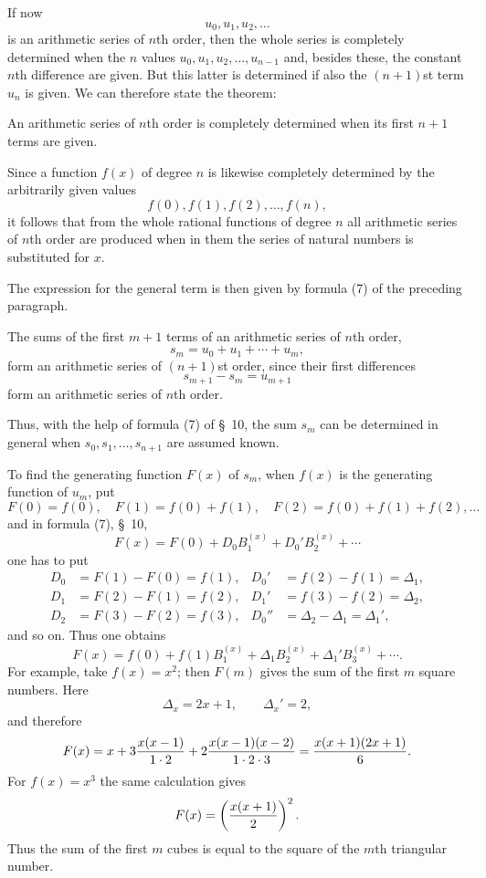 \documentclass[11pt]{article}
\begin{document}
If now
\[
 u_0,u_1,u_2,\ldots
\]
is an arithmetic series of $n$th order, then the whole series is completely determined when the $n$ values $u_0,u_1,u_2,\ldots,u_{n-1}$ and, besides these, the constant $n$th difference are given. But this latter is determined if also the $(n+1)$st term $u_n$ is given. We can therefore state the theorem:

An arithmetic series of $n$th order is completely determined when its first $n+1$ terms are given.

Since a function $f(x)$ of degree $n$ is likewise completely determined by the arbitrarily given values
\[
 f(0),f(1),f(2),\ldots,f(n),
\]
it follows that from the whole rational functions of degree $n$ all arithmetic series of $n$th order are produced when in them the series of natural numbers is substituted for $x$.

The expression for the general term is then given by formula (7) of the preceding paragraph.

The sums of the first $m+1$ terms of an arithmetic series of $n$th order,
\[
 s_m=u_0+u_1+\cdots+u_m,
\]
form an arithmetic series of $(n+1)$st order, since their first differences
\[
 s_{m+1}-s_m=u_{m+1}
\]
form an arithmetic series of $n$th order.

Thus, with the help of formula (7) of \S~10, the sum $s_m$ can be determined in general when $s_0,s_1,\ldots,s_{n+1}$ are assumed known.

To find the generating function $F(x)$ of $s_m$, when $f(x)$ is the generating function of $u_m$, put
\[
 F(0)=f(0),\quad F(1)=f(0)+f(1),\quad F(2)=f(0)+f(1)+f(2),\ldots
\]
and in formula (7), \S~10,
\[
 F(x)=F(0)+D_0B_1^{(x)}+D_0'B_2^{(x)}+\cdots
\]
one has to put
\[
\begin{aligned}
D_0&=F(1)-F(0)=f(1),& D_0'&=f(2)-f(1)=\Delta_1,\\
D_1&=F(2)-F(1)=f(2),& D_1'&=f(3)-f(2)=\Delta_2,\\
D_2&=F(3)-F(2)=f(3),& D_0''&=\Delta_2-\Delta_1=\Delta_1',
\end{aligned}
\]
and so on. Thus one obtains
\begin{equation}
 F(x)=f(0)+f(1)B_1^{(x)}+\Delta_1B_2^{(x)}+\Delta_1'B_3^{(x)}+\cdots.
\tag{4}
\end{equation}
For example, take $f(x)=x^2$; then $F(m)$ gives the sum of the first $m$ square numbers. Here
\[
 \Delta_x=2x+1,\qquad \Delta_x'=2,
\]
and therefore
\[
 F(x)=x+3{x(x-1)\over 1\cdot2}+2{x(x-1)(x-2)
        \over 1\cdot2\cdot3}
      ={x(x+1)(2x+1)\over 6}.
\]
For $f(x)=x^3$ the same calculation gives
\[
 F(x)=\left({x(x+1)\over2}\right)^2.
\]
Thus the sum of the first $m$ cubes is equal to the square of the $m$th triangular number.
\end{document}
